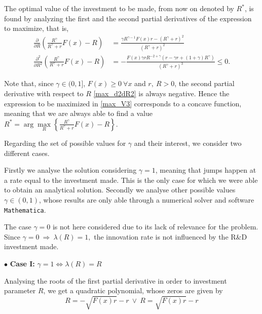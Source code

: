 The optimal value of the investment to be made, from now on denoted by $R^*$, is found by analyzing the first and the second partial derivatives of the expression to maximize, that is,
\begin{align}
\frac{\partial}{\partial R} \left( \frac{R^\gamma}{R^\gamma+r} F(x) -R \right) &= \frac{\gamma R^{\gamma-1}F(x)r-(R^\gamma+r)^2}{(R^\gamma+r)^2} \label{max_ddR}\\
\frac{\partial^2}{\partial R^2} \left( \frac{R^\gamma}{R^\gamma+r} F(x) -R \right) &=
-\frac{F(x) \gamma r R^{-2+\gamma}(r-\gamma r+(1+\gamma)R^\gamma)}{(R^\gamma+r)^3}\leq 0.
\label{max_d2dR2}
\end{align}

Note that, since $\gamma \in (0,1]$, $F(x)\geq0 \ \forall x$ and $r, \ R >0$, the second partial derivative with respect to $R$ \eqref{max_d2dR2} is always negative. Hence the expression to be maximized in \eqref{max_V3} corresponds to a concave function, meaning that we are always able to find a value $R^*=\arg \underset{R}{\max} \left\{ \frac{R^\gamma}{R^\gamma+r} F(x) -R \right\}$.

Regarding the set of possible values for $\gamma$ and their interest, we consider two different cases.

Firstly we analyse the solution considering $\gamma=1$, meaning that jumps happen at a rate equal to the investment made. This is the only case for which
we were able to obtain an analytical solution. Secondly we analyse other possible values $\gamma \in (0,1)$, whose results are only able through a numerical solver and software \texttt{Mathematica}.

The case $\gamma=0$ is not here considered due to its lack of relevance for the problem.
Since $\gamma=0 \ \Rightarrow \ \lambda(R)=1,$ the innovation rate is not influenced by the R\&D investment made.


$\bullet$ \textbf{Case I:} $\gamma=1 \Leftrightarrow \lambda(R)=R$

Analysing the roots of the first partial derivative in order to investment parameter $R$, we get a quadratic polynomial, whose zeros are given by
$$  R=-\sqrt{F(x)r}-r \  \vee \ R=\sqrt{F(x)r}-r$$


